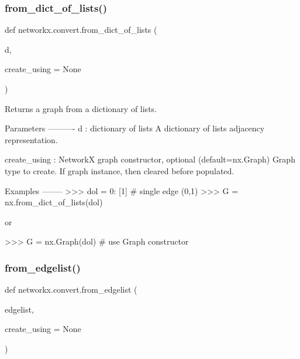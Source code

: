 \subsubsection{\texorpdfstring{from\+\_\+dict\+\_\+of\+\_\+lists()}{from\_dict\_of\_lists()}}
{\footnotesize\ttfamily def networkx.\+convert.\+from\+\_\+dict\+\_\+of\+\_\+lists (\begin{DoxyParamCaption}\item[{}]{d,  }\item[{}]{create\+\_\+using = {\ttfamily None} }\end{DoxyParamCaption})}

\begin{DoxyVerb}Returns a graph from a dictionary of lists.

Parameters
----------
d : dictionary of lists
  A dictionary of lists adjacency representation.

create_using : NetworkX graph constructor, optional (default=nx.Graph)
    Graph type to create. If graph instance, then cleared before populated.

Examples
--------
>>> dol = {0: [1]}  # single edge (0,1)
>>> G = nx.from_dict_of_lists(dol)

or

>>> G = nx.Graph(dol)  # use Graph constructor\end{DoxyVerb}
 \mbox{\label{namespacenetworkx_1_1convert_a7ef2c9ebd23b8d1e5dabcce719bc9d18}} 
\subsubsection{\texorpdfstring{from\+\_\+edgelist()}{from\_edgelist()}}
{\footnotesize\ttfamily def networkx.\+convert.\+from\+\_\+edgelist (\begin{DoxyParamCaption}\item[{}]{edgelist,  }\item[{}]{create\+\_\+using = {\ttfamily None} }\end{DoxyParamCaption})}

